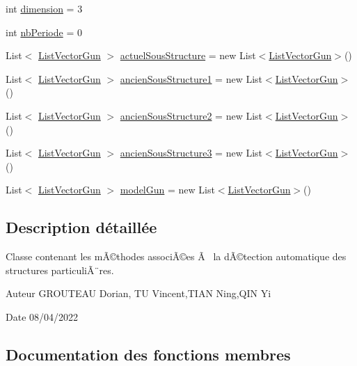 \begin{DoxyCompactItemize}
\item 
int \mbox{\hyperlink{class_detection_afa1d30c1e85af8e9f22288c871a80e27}{dimension}} = 3
\item 
int \mbox{\hyperlink{class_detection_afa6a24f82533b8f55ad0d7ff325f62fd}{nb\+Periode}} = 0
\item 
List$<$ \mbox{\hyperlink{class_list_vector_gun}{List\+Vector\+Gun}} $>$ \mbox{\hyperlink{class_detection_a938e31196e8d2c8a7449d2b92dd3dc0f}{actuel\+Sous\+Structure}} = new List$<$\mbox{\hyperlink{class_list_vector_gun}{List\+Vector\+Gun}}$>$()
\item 
List$<$ \mbox{\hyperlink{class_list_vector_gun}{List\+Vector\+Gun}} $>$ \mbox{\hyperlink{class_detection_a2854566b0e9b52fde71352bd8d3e7ef5}{ancien\+Sous\+Structure1}} = new List$<$\mbox{\hyperlink{class_list_vector_gun}{List\+Vector\+Gun}}$>$()
\item 
List$<$ \mbox{\hyperlink{class_list_vector_gun}{List\+Vector\+Gun}} $>$ \mbox{\hyperlink{class_detection_a5cc275445061be79380716942235b51b}{ancien\+Sous\+Structure2}} = new List$<$\mbox{\hyperlink{class_list_vector_gun}{List\+Vector\+Gun}}$>$()
\item 
List$<$ \mbox{\hyperlink{class_list_vector_gun}{List\+Vector\+Gun}} $>$ \mbox{\hyperlink{class_detection_a3020aaba1943a1f3e42220ede1b1e7c4}{ancien\+Sous\+Structure3}} = new List$<$\mbox{\hyperlink{class_list_vector_gun}{List\+Vector\+Gun}}$>$()
\item 
List$<$ \mbox{\hyperlink{class_list_vector_gun}{List\+Vector\+Gun}} $>$ \mbox{\hyperlink{class_detection_ae14cf1144858a30db9892e36723e9795}{model\+Gun}} = new List$<$\mbox{\hyperlink{class_list_vector_gun}{List\+Vector\+Gun}}$>$()
\end{DoxyCompactItemize}


\subsection{Description détaillée}
Classe contenant les mÃ©thodes associÃ©es Ã  la dÃ©tection automatique des structures particuliÃ¨res. 

\begin{DoxyAuthor}{Auteur}
G\+R\+O\+U\+T\+E\+AU Dorian, TU Vincent,T\+I\+AN Ning,Q\+IN Yi 
\end{DoxyAuthor}
\begin{DoxyDate}{Date}
08/04/2022 
\end{DoxyDate}


\subsection{Documentation des fonctions membres}
\mbox{\label{class_detection_a92c60be1a69ea74b7f7bef04a0e53238}} 
